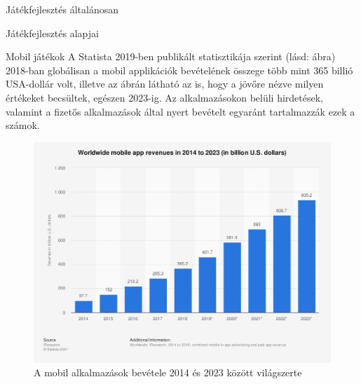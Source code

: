 \begin{MyChapter}{Játékfejlesztés általánosan}
\begin{MySection}{Játékfejlesztés alapjai}
\begin{MySubSection}{Mobil játékok}
		A Statista 2019-ben publikált statisztikája szerint (lásd:  ábra) 2018-ban globálisan a mobil applikációk bevételének összege több mint 365 billió USA-dollár volt, illetve az ábrán látható az is, hogy a jövőre nézve milyen értékeket becsültek, egészen 2023-ig. Az alkalmazásokon belüli hirdetések, valamint a fizetős alkalmazások által nyert bevételt egyaránt tartalmazzák ezek a számok.
		\begin{figure}[h!]
			\centering
			\includegraphics[scale=0.38]{kepek/mobil/total_global_mobile_app_revenues_2014-2023.png}
			\caption{A mobil alkalmazások bevétele 2014 és 2023 között világszerte}
			\label{fig:mobil:total_global_mobile_app_revenues_2014-2023}
		\end{figure}
		

\end{MySubSection}
\end{MySection}
\end{MyChapter}
